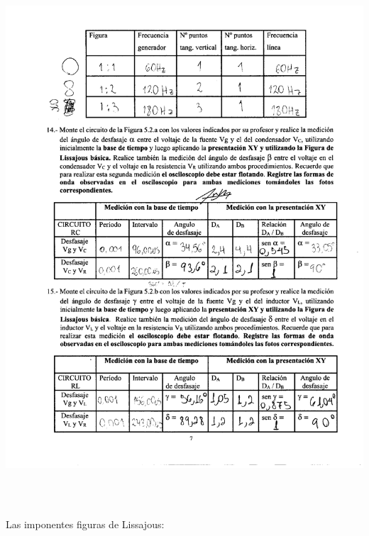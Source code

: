 \documentclass[12pt]{article}
\begin{document}
	\begin{center}
		\includegraphics[width=16cm,height=20cm]{Img/anexo_0005}
	\end{center}

	\newpage
	
	\noindent Las imponentes figuras de Lissajous:
	
\end{document}
